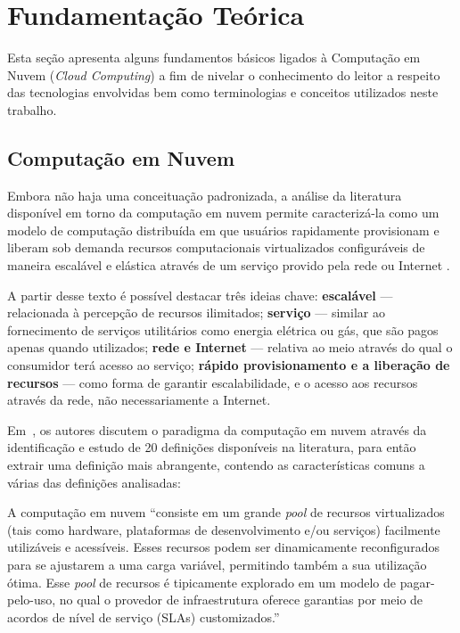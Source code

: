 \section{Fundamentação Teórica}
Esta seção apresenta alguns fundamentos básicos ligados à Computação em Nuvem
(\emph{Cloud Computing}) a fim de nivelar o conhecimento do leitor a respeito
das tecnologias envolvidas bem como terminologias e conceitos utilizados neste
trabalho.

\subsection{Computação em Nuvem}
Embora não haja uma conceituação padronizada, a análise da literatura disponível 
em torno da computação em nuvem permite caracterizá-la como um modelo de computação 
distribuída em que usuários rapidamente provisionam e liberam sob demanda recursos 
computacionais virtualizados configuráveis de maneira escalável e elástica através 
de um serviço provido pela rede ou Internet 
\cite{foster2009cloud,cearley2010case,mell2011nist}. 

A partir desse texto é possível destacar três ideias chave: \textbf{escalável} --- 
relacionada à percepção de recursos ilimitados; \textbf{serviço} --- similar ao 
fornecimento de serviços utilitários como energia elétrica ou gás, que são pagos 
apenas quando utilizados; \textbf{rede e Internet} --- relativa ao meio através do qual o 
consumidor terá acesso ao serviço; \textbf{rápido provisionamento e a liberação de recursos}
 --- como forma de garantir escalabilidade, e o acesso aos recursos através da rede, não
necessariamente a Internet.

Em~\cite{vaquero2008break}, os autores discutem o paradigma da computação em
nuvem através da identificação e estudo de 20 definições disponíveis na literatura, 
para então extrair uma definição mais abrangente, contendo as características comuns 
a várias das definições analisadas:

\begin{citacao}
A computação em nuvem ``consiste em um grande \emph{pool} de recursos virtualizados 
(tais como hardware, plataformas de desenvolvimento e/ou serviços) facilmente 
utilizáveis e acessíveis. Esses recursos podem ser dinamicamente reconfigurados 
para se ajustarem a uma carga variável, permitindo também a sua utilização ótima. 
Esse \emph{pool} de recursos é tipicamente explorado em um modelo de pagar-pelo-uso, 
no qual o provedor de infraestrutura oferece garantias por meio de acordos de nível 
de serviço (SLAs) customizados.''\end{citacao}


